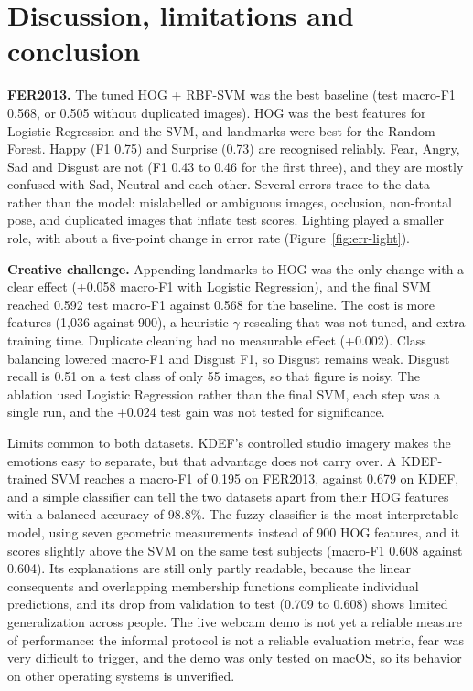 \section{Discussion, limitations and conclusion}


\noindent\textbf{FER2013.}
The tuned HOG + RBF-SVM was the best baseline (test macro-F1 0.568, or 0.505 without duplicated images). HOG was the best features for Logistic Regression and the SVM, and landmarks were best for the Random Forest. Happy (F1 0.75) and Surprise (0.73) are recognised reliably. Fear, Angry, Sad and Disgust are not (F1 0.43 to 0.46 for the first three), and they are mostly confused with Sad, Neutral and each other. Several errors trace to the data rather than the model: mislabelled or ambiguous images, occlusion, non-frontal pose, and duplicated images that inflate test scores. Lighting played a smaller role, with about a five-point change in error rate (Figure~\ref{fig:err-light}).

\par\medskip
\noindent\textbf{Creative challenge.}
Appending landmarks to HOG was the only change with a clear effect (+0.058 macro-F1 with Logistic Regression), and the final SVM reached 0.592 test macro-F1 against 0.568 for the baseline. The cost is more features (1,036 against 900), a heuristic $\gamma$ rescaling that was not tuned, and extra training time. Duplicate cleaning had no measurable effect (+0.002). Class balancing lowered macro-F1 and Disgust F1, so Disgust remains weak. Disgust recall is 0.51 on a test class of only 55 images, so that figure is noisy. The ablation used Logistic Regression rather than the final SVM, each step was a single run, and the +0.024 test gain was not tested for significance.

Limits common to both datasets. KDEF's controlled studio imagery makes the emotions easy to separate, but that advantage does not carry over. A KDEF-trained SVM reaches a macro-F1 of 0.195 on FER2013, against 0.679 on KDEF, and a simple classifier can tell the two datasets apart from their HOG features with a balanced accuracy of 98.8\%. The fuzzy classifier is the most interpretable model, using seven geometric measurements instead of 900 HOG features, and it scores slightly above the SVM on the same test subjects (macro-F1 0.608 against 0.604). Its explanations are still only partly readable, because the linear consequents and overlapping membership functions complicate individual predictions, and its drop from validation to test (0.709 to 0.608) shows limited generalization across people. The live webcam demo is not yet a reliable measure of performance: the informal protocol is not a reliable evaluation metric, fear was very difficult to trigger, and the demo was only tested on macOS, so its behavior on other operating systems is unverified.